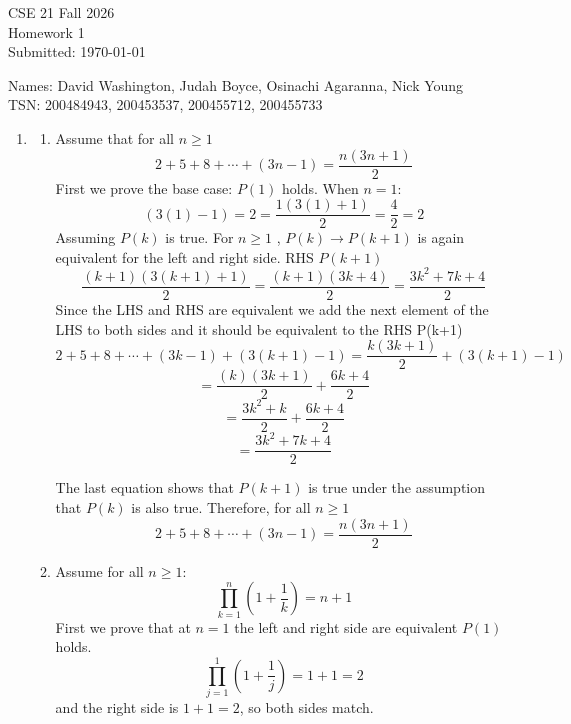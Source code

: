 \documentclass{article}
\begin{document}
\begin{flushright}
CSE 21 Fall 2026\\
Homework 1\\
Submitted: {\today}
\end{flushright}

\begin{center}
Names: David Washington, Judah Boyce, Osinachi Agaranna, Nick Young\\
TSN: 200484943, 200453537, 200455712, 200455733
\end{center}

\begin{enumerate}
    \item
    \begin{enumerate}
      \item Assume that for all $n \ge 1$ 
        \[
            2 + 5 + 8 + \cdots + (3n - 1) = \frac{n(3n + 1)}{2}
        \]
        First we prove the base case: $P(1)$ holds. When $n = 1$:
        \[
          (3(1) - 1) 
          = 2
          = \frac{1(3(1) + 1)}{2}
          =  \frac{4}{2}
          = 2
        \]
        Assuming $P(k)$ is true. For $n \ge 1$ , $P(k) \rightarrow P(k+1)$ is again equivalent for the left and right side.
        RHS $P(k+1)$
        \[
          \frac{(k+1)(3(k+1) + 1)}{2}
          = \frac{(k+1)(3k+4)}{2}
          = \frac{3k^2+7k+4}{2}
        \]
        Since the LHS and RHS are equivalent we add the next element of the LHS to both sides and it should be equivalent to the RHS P(k+1)
        \[
          2 + 5 + 8 + \cdots + (3k - 1) + (3(k+1)-1)
          = \frac{k(3k+1)}{2} + (3(k+1)-1)
        \]
        \[
          = \frac{(k)(3k+1)}{2} + \frac{6k+4}{2} 
        \]
        \[
          = \frac{3k^2+k}{2} + \frac{6k+4}{2} 
        \]
        \[
          = \frac{3k^2+7k+4}{2}
        \]

      The last equation shows that $P(k+1)$ is true under the assumption that $P(k)$ is also true. Therefore, for all $n \ge 1$ 
        \[
            2 + 5 + 8 + \cdots + (3n - 1) = \frac{n(3n + 1)}{2}
        \]
   

      \item Assume for all $n \geq 1$:
      \[
        \prod_{k=1}^{n}\left(1 + \frac{1}{k}\right) = n + 1
      \]
      First we prove that at $n=1$ the left and right side are equivalent $P(1)$ holds.
      \[
        \prod_{j=1}^{1}\left(1 + \frac{1}{j}\right)
        = 1 + 1
        = 2
      \]
      and the right side is $1 + 1 = 2$, so both sides match.


\end{enumerate}
\end{enumerate}
\end{document}
